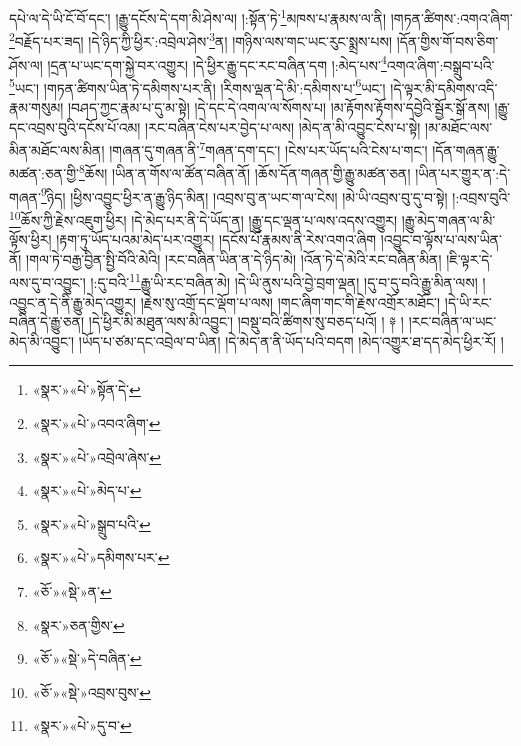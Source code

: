 དཔེ་ལ་དེ་ཡི་ངོ་བོ་དང་། །རྒྱུ་དངོས་དེ་དག་མི་ཤེས་ལ། །:སྟོན་ཏེ་\footnote{«སྣར་»«པེ་»སྟོན་དེ་}མཁས་པ་རྣམས་ལ་ནི། །གཏན་ཚིགས་:འགའ་ཞིག་\footnote{«སྣར་»«པེ་»འབའ་ཞིག་}བརྗོད་པར་ཟད། །དེ་ཉིད་ཀྱི་ཕྱིར་:འབྲེལ་ཤེས་\footnote{«སྣར་»«པེ་»འབྲེལ་ཞེས་}ན། །གཉིས་ལས་གང་ཡང་རུང་སྨྲས་པས། །དོན་གྱིས་གོ་བས་ཅིག་ཤོས་ལ། །དྲན་པ་ཡང་དག་སྐྱེ་བར་འགྱུར། །དེ་ཕྱིར་རྒྱུ་དང་རང་བཞིན་དག །:མེད་པས་\footnote{«སྣར་»«པེ་»མེད་པ་}འགའ་ཞིག་:བསྒྲུབ་པའི་\footnote{«སྣར་»«པེ་»སྒྲུབ་པའི་}ཡང་། །གཏན་ཚིགས་ཡིན་ཏེ་དམིགས་པར་ནི། །རིགས་ལྡན་དེ་མི་:དམིགས་པ་\footnote{«སྣར་»«པེ་»དམིགས་པར་}ཡང་། །དེ་ལྟར་མི་དམིགས་འདི་རྣམ་གསུམ། །བཤད་ཀྱང་རྣམ་པ་དུ་མ་སྟེ། །དེ་དང་དེ་འགལ་ལ་སོགས་པ། །མ་རྟོགས་རྟོགས་དབྱེའི་སྦྱོར་སྒོ་ནས། །རྒྱུ་དང་འབྲས་བུའི་དངོས་པོ་འམ། །རང་བཞིན་ངེས་པར་བྱེད་པ་ལས། །མེད་ན་མི་འབྱུང་ངེས་པ་སྟེ། །མ་མཐོང་ལས་མིན་མཐོང་ལས་མིན། །གཞན་དུ་གཞན་ནི་\footnote{«ཅོ་»«སྡེ་»ན་}གཞན་དག་དང་། །ངེས་པར་ཡོད་པའི་ངེས་པ་གང་། །དོན་གཞན་རྒྱུ་མཚན་:ཅན་གྱི་\footnote{«སྣར་»ཅན་གྱིས་}ཆོས། །ཡིན་ན་གོས་ལ་ཚོན་བཞིན་ནོ། །ཆོས་དོན་གཞན་གྱི་རྒྱུ་མཚན་ཅན། །ཡིན་པར་གྱུར་ན་:དེ་གཞན་\footnote{«ཅོ་»«སྡེ་»དེ་བཞིན་}ཉིད། །ཕྱིས་འབྱུང་ཕྱིར་ན་རྒྱུ་ཉིད་མིན། །འབྲས་བུ་ན་ཡང་ག་ལ་ངེས། །མེ་ཡི་འབྲས་བུ་དུ་བ་སྟེ། །:འབྲས་བུའི་\footnote{«ཅོ་»«སྡེ་»འབྲས་བུས་}ཆོས་ཀྱི་རྗེས་འཇུག་ཕྱིར། །དེ་མེད་པར་ནི་དེ་ཡོད་ན། །རྒྱུ་དང་ལྡན་པ་ལས་འདས་འགྱུར། །རྒྱུ་མེད་གཞན་ལ་མི་ལྟོས་ཕྱིར། །རྟག་ཏུ་ཡོད་པའམ་མེད་པར་འགྱུར། །དངོས་པོ་རྣམས་ནི་རེས་འགའ་ཞིག །འབྱུང་བ་ལྟོས་པ་ལས་ཡིན་ནོ། །གལ་ཏེ་བརྒྱ་བྱིན་སྤྱི་བོའི་མེའི། །རང་བཞིན་ཡིན་ན་དེ་ཉིད་མེ། །འོན་ཏེ་དེ་མེའི་རང་བཞིན་མིན། །ཇི་ལྟར་དེ་ལས་དུ་བ་འབྱུང་། །:དུ་བའི་\footnote{«སྣར་»«པེ་»དུ་བ་}རྒྱུ་ཡི་རང་བཞིན་མེ། །དེ་ཡི་ནུས་པའི་བྱེ་བྲག་ལྡན། །དུ་བ་དུ་བའི་རྒྱུ་མིན་ལས། །འབྱུང་ན་དེ་ནི་རྒྱུ་མེད་འགྱུར། །རྗེས་སུ་འགྲོ་དང་ལྡོག་པ་ལས། །གང་ཞིག་གང་གི་རྗེས་འགྲོར་མཐོང་། །དེ་ཡི་རང་བཞིན་དེ་རྒྱུ་ཅན། །དེ་ཕྱིར་མི་མཐུན་ལས་མི་འབྱུང་། །བསྡུ་བའི་ཚིགས་སུ་བཅད་པའོ། ། ༈ ། །རང་བཞིན་ལ་ཡང་མེད་མི་འབྱུང་། །ཡོད་པ་ཙམ་དང་འབྲེལ་བ་ཡིན། །དེ་མེད་ན་ནི་ཡོད་པའི་བདག །མེད་འགྱུར་ཐ་དད་མེད་ཕྱིར་རོ། །
